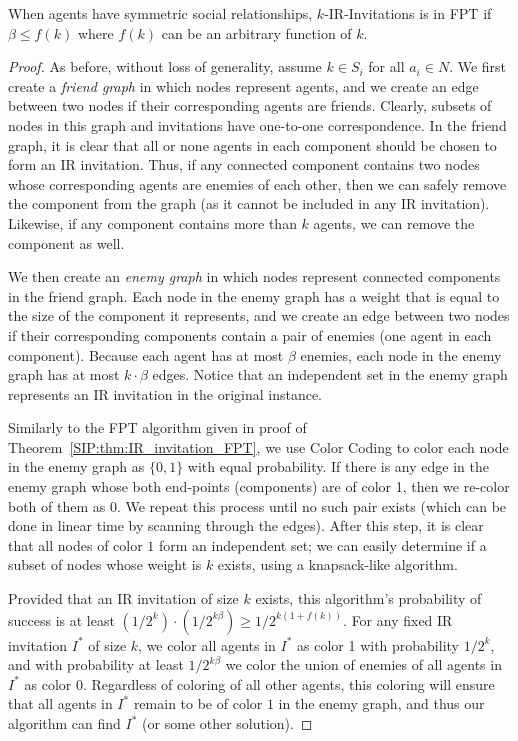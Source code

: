 \begin{theorem} \label{SIP:thm:symmetric_IR_FPT}
	When agents have symmetric social relationships, 
	$k$-IR-Invitations is in FPT if $\beta \leq f(k)$ where $f(k)$ can be an arbitrary function of $k$. 
\end{theorem}
\begin{proof}
	As before, without loss of generality, assume $k\in S_i$ for all $a_i\in N$. 
	We first create a {\em friend graph} in which nodes represent agents, and we create an edge between two nodes if their corresponding agents are friends. Clearly, subsets of nodes in this graph and invitations have one-to-one correspondence.
	In the friend graph, it is clear that all or none agents in each component should be chosen to form an IR invitation. 
	Thus, if any connected component contains two nodes whose corresponding agents are enemies of each other, then we can safely remove the component from the graph (as it cannot be included in any IR invitation).
	Likewise, if any component contains more than $k$ agents, we can remove the component as well. 
	
	We then create an {\em enemy graph} in which nodes represent connected components in the friend graph. Each node in the enemy graph has a weight that is equal to the size of the component it represents, and we create an edge between two nodes if their corresponding components contain a pair of enemies (one agent in each component). Because each agent has at most $\beta$ enemies, each node in the enemy graph has at most $k\cdot \beta$ edges. 
	Notice that an independent set in the enemy graph represents an IR invitation in the original instance. 
		
	Similarly to the FPT algorithm given in proof of Theorem~\ref{SIP:thm:IR_invitation_FPT}, we use Color Coding to color each node in the enemy graph as $\{0,1\}$ with equal probability.
	If there is any edge in the enemy graph whose both end-points (components) are of color 1, then we re-color both of them as 0. We repeat this process until no such pair exists (which can be done in linear time by scanning through the edges). 
	After this step, it is clear that all nodes of color $1$ form an independent set; we can easily determine if a subset of nodes whose weight is $k$ exists, using a knapsack-like algorithm. 
	
	Provided that an IR invitation of size $k$ exists, this algorithm's probability of success is at least $(1/2^k) \cdot (1/2^{k\beta}) \geq 1/2^{k(1+f(k))}$. For any fixed IR invitation $I^*$ of size $k$, 
	we color all agents in $I^*$ as color 1 with probability $1/2^k$, and with probability at least $1/2^{k \beta}$ we color the union of enemies of all agents in $I^*$ as color $0$. Regardless of coloring of all other agents, this coloring will ensure that all agents in $I^*$ remain to be of color $1$ in the enemy graph, and thus our algorithm can find $I^*$ (or some other solution). 
	

\end{proof}
